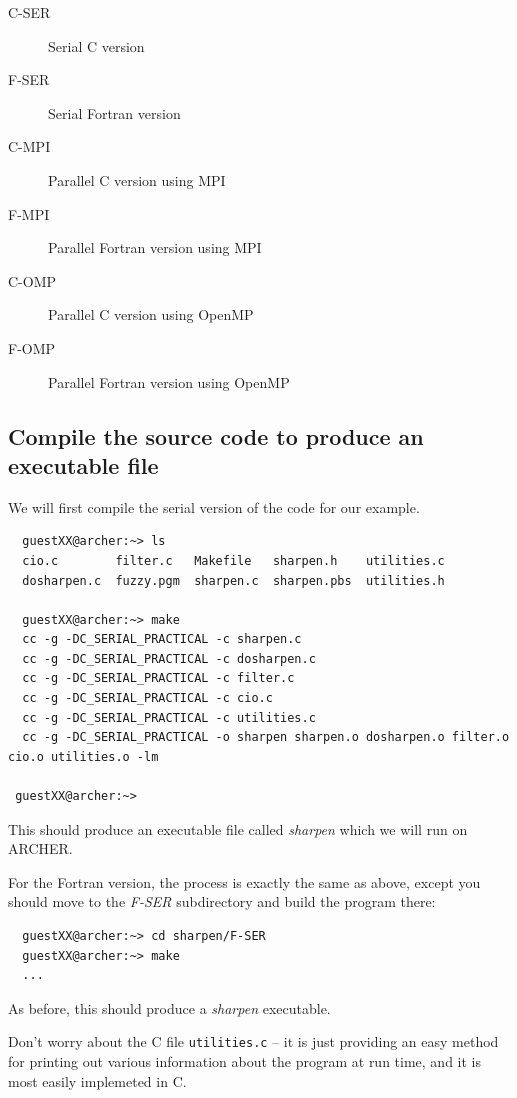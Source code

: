 \documentclass{article}
\begin{document}
\begin{description}
\item[C-SER] Serial C version
\item[F-SER] Serial Fortran version
\item[C-MPI] Parallel C version using MPI
\item[F-MPI] Parallel Fortran version using MPI
\item[C-OMP] Parallel C version using OpenMP
\item[F-OMP] Parallel Fortran version using OpenMP

\end{description}
\subsection{Compile the source code to produce an executable file}
\label{sec-3-6}

We will first compile the serial version of the code for our
example.

\begin{verbatim}
  guestXX@archer:~> ls
  cio.c        filter.c   Makefile   sharpen.h    utilities.c
  dosharpen.c  fuzzy.pgm  sharpen.c  sharpen.pbs  utilities.h

  guestXX@archer:~> make
  cc -g -DC_SERIAL_PRACTICAL -c sharpen.c
  cc -g -DC_SERIAL_PRACTICAL -c dosharpen.c
  cc -g -DC_SERIAL_PRACTICAL -c filter.c
  cc -g -DC_SERIAL_PRACTICAL -c cio.c
  cc -g -DC_SERIAL_PRACTICAL -c utilities.c
  cc -g -DC_SERIAL_PRACTICAL -o sharpen sharpen.o dosharpen.o filter.o cio.o utilities.o -lm

 guestXX@archer:~> 
\end{verbatim}

This should produce an executable file called \emph{sharpen} which we
will run on ARCHER.

For the Fortran version, the process is exactly the same as above,
except you should move to the \emph{F-SER} subdirectory and build the
program there:

\begin{verbatim}
  guestXX@archer:~> cd sharpen/F-SER
  guestXX@archer:~> make
  ...
\end{verbatim}

As before, this should produce a \emph{sharpen} executable.

Don't worry about the C file \verb+utilities.c+ -- it is just
providing an easy method for printing out various information about
the program at run time, and it is most easily implemeted in C.
\end{document}
